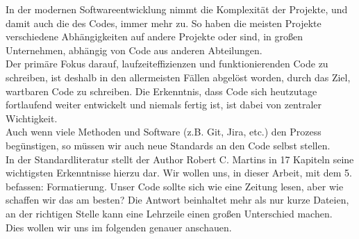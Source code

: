 In der modernen Softwareentwicklung nimmt die Komplexität der Projekte, und damit auch die des Codes, immer mehr zu.
So haben die meisten Projekte verschiedene Abhängigkeiten auf andere Projekte oder sind, in großen Unternehmen, abhängig von Code aus anderen Abteilungen.\\
Der primäre Fokus darauf, laufzeiteffizienzen und funktionierenden Code zu schreiben, ist deshalb in den allermeisten Fällen abgelöst worden, durch das Ziel, wartbaren Code zu schreiben.
Die Erkenntnis, dass Code sich heutzutage fortlaufend weiter entwickelt und niemals fertig ist, ist dabei von zentraler Wichtigkeit.\\
Auch wenn viele Methoden und Software (z.B. Git, Jira, etc.) den Prozess  begünstigen, so müssen wir auch neue Standards an den Code selbst stellen.\\
In der Standardliteratur  \autocite{martin-2008} stellt der Author Robert C. Martins in 17 Kapiteln seine wichtigsten Erkenntnisse hierzu dar.
Wir wollen uns, in dieser Arbeit, mit dem 5. befassen: Formatierung.
Unser Code sollte sich wie eine Zeitung lesen, aber wie schaffen wir das am besten?
Die Antwort beinhaltet mehr als nur kurze Dateien, an der richtigen Stelle kann eine Lehrzeile einen großen Unterschied machen.\\
Dies wollen wir uns im folgenden genauer anschauen.